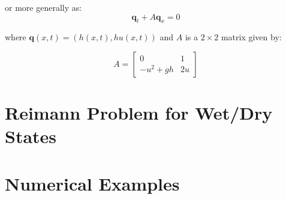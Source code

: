 \documentclass[12pt,a4paper]{article}
\begin{document}
	\noindent or more generally as:
	\begin{equation}
		\mathbf q_t + A \mathbf q_x = 0
	\end{equation}
	
	\noindent where $\mathbf q(x,t) = (h(x,t), hu(x,t))$ and $A$ is a $2 \times 2$ matrix given by:
	
	\begin{equation}
		A = \begin{bmatrix} 0 &  1 \\ -u^{2} + gh & 2u \end{bmatrix}
	\end{equation}
	



	\section{Reimann Problem for Wet/Dry States}
	
	
	
		\section{Numerical Examples}



	
	
	
\end{document}
